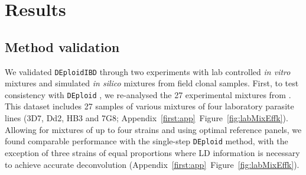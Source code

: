 \documentclass[9pt,lineno]{elife}
\begin{document}
\begin{figure}[ht]
\end{figure}




\section{Results}

\subsection{Method validation}

We validated \texttt{DEploidIBD} through two experiments with lab controlled {\it in vitro} mixtures and simulated {\it in silico} mixtures from field clonal samples.  First, to test consistency with \texttt{DEploid} \citet{Zhu2017}, we re-analysed the 27 experimental mixtures from \citep{Wendler2015}.  This dataset includes 27 samples of various mixtures of four laboratory parasite lines (3D7, Dd2, HB3 and 7G8; Appendix~\ref{first:app}~Figure~\ref{fig:labMixEffk}).  Allowing for mixtures of up to four strains and using optimal reference panels, we found comparable performance with the single-step \texttt{DEploid} method, with the exception of three strains of equal proportions where LD information is necessary to achieve accurate deconvolution (Appendix~\ref{first:app}~Figure~\ref{fig:labMixEffk}).
\end{document}
